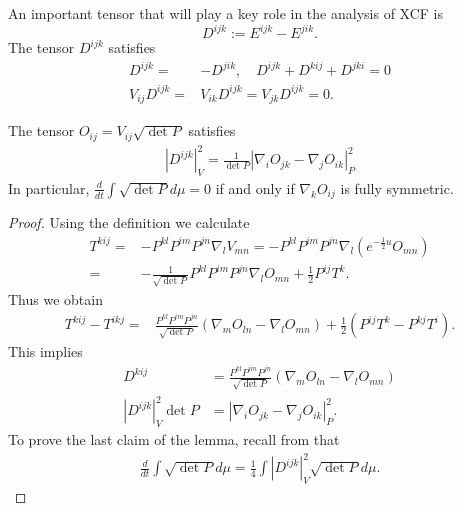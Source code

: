 \documentclass[a4paper, 12pt]{amsart}
\begin{document}
An important tensor that will play a key role in the analysis of XCF is
\[D^{ijk}:=E^{ijk}-E^{jik}.\]
The tensor $D^{ijk}$ satisfies
\begin{align}
D^{ijk}=&-D^{jik},\quad D^{ijk}+D^{kij}+D^{jki}=0\\
V_{ij}D^{ijk}=&V_{ik}D^{ijk}=V_{jk}D^{ijk}=0.
\end{align}
\begin{lemma}\label{codazzi}
The tensor $O_{ij}=V_{ij}\sqrt{\det P}$ satisfies
\begin{align}
|D^{ijk}|_V^2=\frac{1}{\det P}|\nabla_iO_{jk}-\nabla_jO_{ik}|_P^2
\end{align}
In particular, $\frac{d}{dt}\int \sqrt{\det P}d\mu=0$ if and only if $\nabla_k O_{ij}$ is fully symmetric.
\end{lemma}
\begin{proof}
Using the definition we calculate
\begin{align}
T^{kij}=&-P^{kl}P^{im}P^{jn}\nabla_l V_{mn}=-P^{kl}P^{im}P^{jn}\nabla_l (e^{-\frac{1}{2}u}O_{mn})\\
=&-\frac{1}{\sqrt{\det P}}P^{kl}P^{im}P^{jn}\nabla_l O_{mn}+\frac{1}{2}P^{ij}T^k.
\end{align}
Thus we obtain
\begin{align*}
T^{kij}-T^{ikj}=&\frac{P^{kl}P^{im}P^{jn}}{\sqrt{\det P}}\left(\nabla_m O_{ln}-\nabla_l O_{mn}\right)+\frac{1}{2}(P^{ij}T^k-P^{kj}T^i).
\end{align*}
This implies
\begin{align}
D^{kij}&=\frac{P^{kl}P^{im}P^{jn}}{\sqrt{\det P}}\left(\nabla_m O_{ln}-\nabla_l O_{mn}\right)\\
|D^{ijk}|_V^2\det P&=|\nabla_iO_{jk}-\nabla_jO_{ik}|_P^2.
\end{align}
To prove the last claim of the lemma, recall from \cite[page 6]{MR2055396} that
\begin{align}
\frac{d}{dt}\int \sqrt{\det P}d\mu=\frac{1}{4}\int |D^{ijk}|_V^2\sqrt{\det P}d\mu.
\end{align}
\end{proof}

\printbibliography
\end{document}
